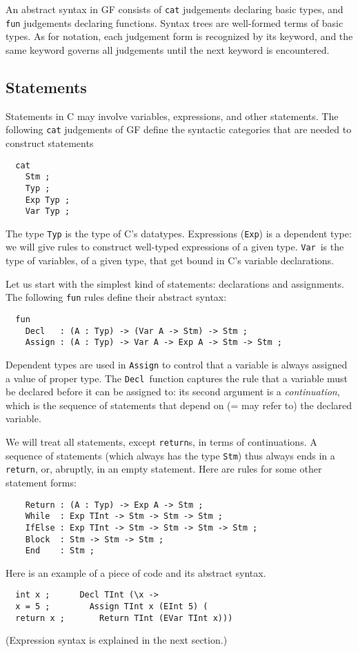 \documentclass[12pt]{article}
\newcommand{\empha}[1]{{\em #1}}
\begin{document}
An abstract syntax in GF consists of \texttt{cat} judgements
declaring basic types, and \texttt{fun} judgements declaring
functions. Syntax trees are well-formed terms of basic
types. As for notation, each judgement form is recognized by
its keyword, and the same keyword governs all judgements
until the next keyword is encountered.


\subsection{Statements}

Statements in C may involve variables, expressions, and
other statements.
The following \texttt{cat} judgements of GF define the syntactic categories
that are needed to construct statements
\begin{verbatim}
  cat
    Stm ;
    Typ ;
    Exp Typ ;
    Var Typ ;
\end{verbatim}
The type \texttt{Typ} is the type of C's datatypes.
Expressions (\texttt{Exp}) is a dependent type: we
will give rules to construct well-typed expressions of
a given type. \texttt{Var}\ is the type of variables,
of a given type, that get bound in C's variable
declarations.

Let us start with the simplest kind of statements:
declarations and assignments. The following \texttt{fun}
rules define their abstract syntax:
\begin{verbatim}
  fun
    Decl   : (A : Typ) -> (Var A -> Stm) -> Stm ;
    Assign : (A : Typ) -> Var A -> Exp A -> Stm -> Stm ;
\end{verbatim}
Dependent types are used in \texttt{Assign} to
control that a variable is always assigned a value of proper
type. The \texttt{Decl}\ function captures the rule that
a variable must be declared before it can be assigned to:
its second argument is a \empha{continuation}, which is
the sequence of statements that depend on (= may refer to)
the declared variable. 

We will treat all statements, except
\texttt{return}s, in terms of continuations. A sequence of
statements (which always has the type \texttt{Stm}) thus
always ends in a \texttt{return}, or, abruptly, in
an empty statement. Here are rules for some other
statement forms:
\begin{verbatim}
    Return : (A : Typ) -> Exp A -> Stm ;
    While  : Exp TInt -> Stm -> Stm -> Stm ;
    IfElse : Exp TInt -> Stm -> Stm -> Stm -> Stm ;
    Block  : Stm -> Stm -> Stm ;
    End    : Stm ;
\end{verbatim}
Here is an example of a piece of code and its abstract syntax.
\begin{verbatim}
  int x ;      Decl TInt (\x -> 
  x = 5 ;        Assign TInt x (EInt 5) (
  return x ;       Return TInt (EVar TInt x)))
\end{verbatim}
(Expression syntax is explained in the next section.)
\end{document}
